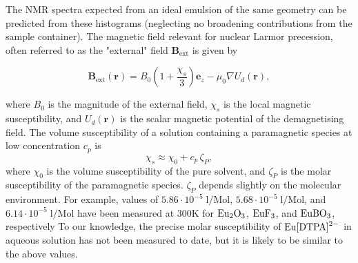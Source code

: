 The NMR spectra expected from an ideal emulsion of the same geometry can
be predicted from these histograms
(neglecting no broadening contributions from the sample container).
The magnetic field relevant for nuclear Larmor precession, often referred
to as the "external" field\citep{Levitt:1996tg} $\mathbf{B}_\text{ext}$  is
given by\citep{Ryan:2014hl}

\begin{equation}
\mathbf{B}_\text{ext}(\mathbf{r})
= B_0 (1+\frac{\chi_s}{3}) \mathbf{e}_z  - {\mu_0} \nabla U_d(\mathbf{r}),
\end{equation}

where $B_0$ is the magnitude of the external field, $\chi_s$ is the local
magnetic susceptibility, and $U_d(\mathbf{r})$ is the scalar magnetic potential
of the demagnetising field. The volume susceptibility of a solution containing a
paramagnetic species at low concentration $c_p$ is
\begin{equation}
    \chi_s \approx \chi_0 + c_p\,\zeta_P,
\end{equation}
where $\chi_0$ is the volume susceptibility of the pure solvent,
and $\zeta_P$ is the
molar susceptibility of the paramagnetic species. $\zeta_P$ depends
slightly on the molecular environment. For example, values of
$5.86\cdot 10^{-5}\;\mathrm{l/\text{Mol}}$,
$5.68\cdot 10^{-5}\;\mathrm{l/\text{Mol}}$, and
$6.14\cdot 10^{-5}\;\mathrm{l/\text{Mol}}$ have been measured at 300K for
$\ce{Eu_2O_3}$, $\ce{EuF_3}$, and $\ce{EuBO_3}$, respectively\citep{Takikawa:2010iw}
To our knowledge, the precise molar susceptibility of $\ce{Eu[DTPA]^{2-}}$ in
aqueous solution has not been measured to date, but it is likely to be
similar to the above values.

